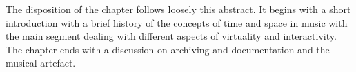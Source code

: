\documentclass[a4paper]{article}
\begin{document}
The disposition of the chapter follows loosely this abstract. It begins with a short introduction with a brief history of the concepts of time and space in music with the main segment dealing with different aspects of virtuality and interactivity. The chapter ends with a discussion on archiving and documentation and the musical artefact.








\end{document}
